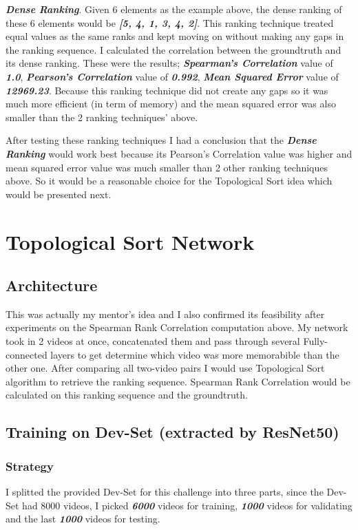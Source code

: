 \textbf{\emph{Dense Ranking}}. Given 6 elements as the example above, the dense ranking of these 6 elements would be \textbf{\emph{[5, 4, 1, 3, 4, 2]}}. This ranking technique treated equal values as the same ranks and kept moving on without making any gaps in the ranking sequence. I calculated the correlation between the groundtruth and its dense ranking. These were the results; \textbf{\emph{Spearman's Correlation}} value of \textbf{\emph{1.0}}, \textbf{\emph{Pearson's Correlation}} value of \textbf{\emph{0.992}}, \textbf{\emph{Mean Squared Error}} value of \textbf{\emph{12969.23}}. Because this ranking technique did not create any gaps so it was much more efficient (in term of memory) and the mean squared error was also smaller than the 2 ranking techniques' above.

After testing these ranking techniques I had a conclusion that the \textbf{\emph{Dense Ranking}} would work best because its Pearson's Correlation value was higher and mean squared error value was much smaller than 2 other ranking techniques above. So it would be a reasonable choice for the Topological Sort idea which would be presented next.

\section{Topological Sort Network}
\subsection{Architecture}
This was actually my mentor's idea and I also confirmed its feasibility after experiments on the Spearman Rank Correlation computation above. My network took in 2 videos at once, concatenated them and pass through several Fully-connected layers to get determine which video was more memorabible than the other one. After comparing all two-video pairs I would use Topological Sort algorithm to retrieve the ranking sequence. Spearman Rank Correlation would be calculated on this ranking sequence and the groundtruth.

\subsection{Training on Dev-Set (extracted by ResNet50)}
\subsubsection{Strategy}
I splitted the provided Dev-Set for this challenge into three parts, since the Dev-Set had 8000 videos, I picked \textbf{\emph{6000}} videos for training, \textbf{\emph{1000}} videos for validating and the last \textbf{\emph{1000}} videos for testing.

